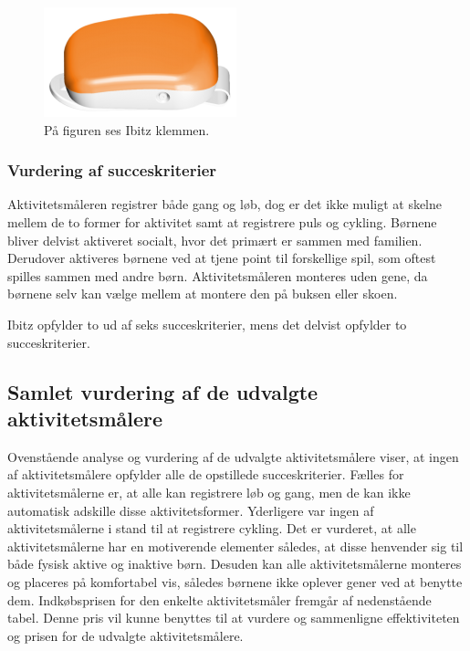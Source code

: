 \begin{figure}[H]
	\centering
	\includegraphics[scale=0.9]{figures/aProblemanalyse/ibitz.png}
	\caption{På figuren ses Ibitz klemmen.\citep{Ibitz_features2016}}
	\label{fig:ibitz}
\end{figure}

\subsubsection{Vurdering af succeskriterier}
Aktivitetsmåleren registrer både gang og løb, dog er det ikke muligt at skelne mellem de to former for aktivitet samt at registrere puls og cykling. Børnene bliver delvist aktiveret socialt, hvor det primært er sammen med familien. Derudover aktiveres børnene ved at tjene point til forskellige spil, som oftest spilles sammen med andre børn. Aktivitetsmåleren monteres uden gene, da børnene selv kan vælge mellem at montere den på buksen eller skoen.  

Ibitz opfylder to ud af seks succeskriterier, mens det delvist opfylder to succeskriterier.

\subsection{Samlet vurdering af de udvalgte aktivitetsmålere}
Ovenstående analyse og vurdering af de udvalgte aktivitetsmålere viser, at ingen af aktivitetsmålere opfylder alle de opstillede succeskriterier. \newline
Fælles for aktivitetsmålerne er, at alle kan registrere løb og gang, men de kan ikke automatisk adskille disse aktivitetsformer. Yderligere var ingen af aktivitetsmålerne i stand til at registrere cykling. Det er vurderet, at alle aktivitetsmålerne har en motiverende elementer således, at disse henvender sig til både fysisk aktive og inaktive børn. Desuden kan alle aktivitetsmålerne monteres og placeres på komfortabel vis, således børnene ikke oplever gener ved at benytte dem. Indkøbsprisen for den enkelte aktivitetsmåler fremgår af nedenstående tabel. Denne pris vil kunne benyttes til at vurdere og sammenligne effektiviteten og prisen for de udvalgte aktivitetsmålere.  

